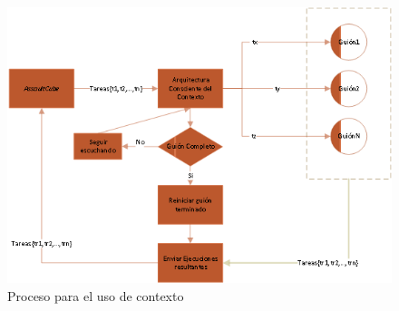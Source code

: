 \begin{figure}[h!]
\centering
\includegraphics[scale=0.90]{images/RunningProcess_ESP}
\caption{Proceso para el uso de contexto}
\label{arch:useofcontext}
\end{figure}